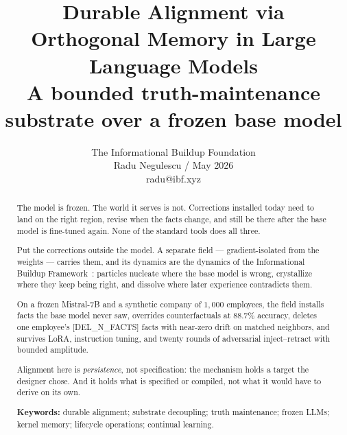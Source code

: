 \documentclass[11pt,twocolumn]{article}
\newcommand{\PH}[1]{[\textsc{#1}]}
\theoremstyle{plain}
\begin{document}

\title{%
  \textbf{Durable Alignment via}\\[4pt]
  \textbf{Orthogonal Memory in Large Language Models}\\[8pt]
  \large\normalfont A bounded truth-maintenance substrate over a frozen base model
}

\author{%
  \normalsize The Informational Buildup Foundation\\[4pt]
  \normalsize Radu Negulescu / May 2026\\[4pt]
  \normalsize radu@ibf.xyz
}
\date{}

\maketitle

\begin{abstract}
\noindent
The model is frozen. The world it serves is not. Corrections installed today need to land on the right region, revise when the facts change, and still be there after the base model is fine-tuned again. None of the standard tools does all three.

Put the corrections outside the model. A separate field --- gradient-isolated from the weights --- carries them, and its dynamics are the dynamics of the Informational Buildup Framework~\cite{negulescu2026ibf}: particles nucleate where the base model is wrong, crystallize where they keep being right, and dissolve where later experience contradicts them.

On a frozen Mistral-7B and a synthetic company of $1{,}000$ employees, the field installs facts the base model never saw, overrides counterfactuals at $88.7\%$ accuracy, deletes one employee's \PH{DEL\_N\_FACTS} facts with near-zero drift on matched neighbors, and survives LoRA, instruction tuning, and twenty rounds of adversarial inject--retract with bounded amplitude.

Alignment here is \emph{persistence}, not specification: the mechanism holds a target the designer chose. And it holds what is specified or compiled, not what it would have to derive on its own.

\vspace{0.6em}
\noindent\textbf{Keywords:}
durable alignment; substrate decoupling; truth maintenance; frozen LLMs; kernel memory; lifecycle operations; continual learning.
\end{abstract}
\end{document}
